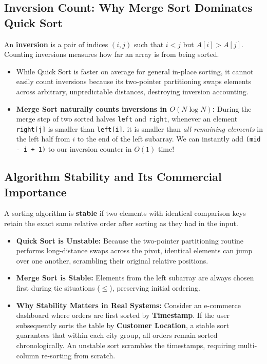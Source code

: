\documentclass[10pt,journal,compsoc,onecolumn]{IEEEtran}
\begin{document}
\subsection{Inversion Count: Why Merge Sort Dominates Quick Sort}

An \textbf{inversion} is a pair of indices $(i, j)$ such that $i < j$ but $A[i] > A[j]$. Counting inversions measures how far an array is from being sorted.
\begin{itemize}
    \item While Quick Sort is faster on average for general in-place sorting, it cannot easily count inversions because its two-pointer partitioning swaps elements across arbitrary, unpredictable distances, destroying inversion accounting.
    \item \textbf{Merge Sort naturally counts inversions in $O(N \log N)$:} During the merge step of two sorted halves \texttt{left} and \texttt{right}, whenever an element \texttt{right[j]} is smaller than \texttt{left[i]}, it is smaller than \emph{all remaining elements} in the left half from $i$ to the end of the left subarray. We can instantly add \texttt{(mid - i + 1)} to our inversion counter in $O(1)$ time!
\end{itemize}

\subsection{Algorithm Stability and Its Commercial Importance}

A sorting algorithm is \textbf{stable} if two elements with identical comparison keys retain the exact same relative order after sorting as they had in the input.
\begin{itemize}
    \item \textbf{Quick Sort is Unstable:} Because the two-pointer partitioning routine performs long-distance swaps across the pivot, identical elements can jump over one another, scrambling their original relative positions.
    \item \textbf{Merge Sort is Stable:} Elements from the left subarray are always chosen first during tie situations ($\le$), preserving initial ordering.
    \item \textbf{Why Stability Matters in Real Systems:} Consider an e-commerce dashboard where orders are first sorted by \textbf{Timestamp}. If the user subsequently sorts the table by \textbf{Customer Location}, a stable sort guarantees that within each city group, all orders remain sorted chronologically. An unstable sort scrambles the timestamps, requiring multi-column re-sorting from scratch.
\end{itemize}
\end{document}

